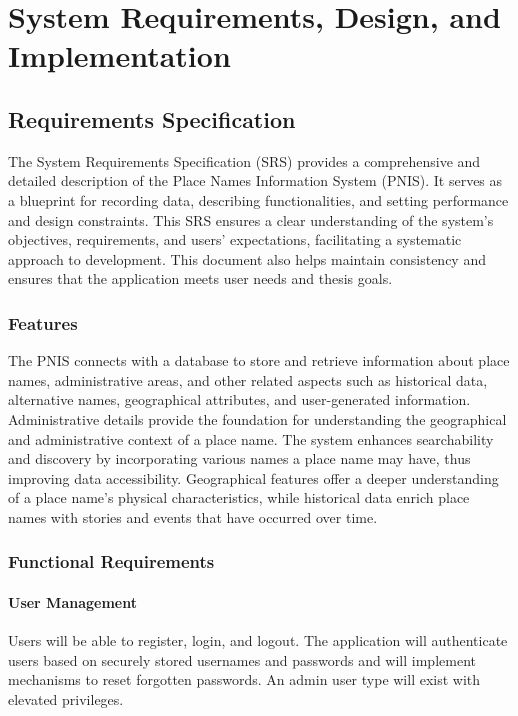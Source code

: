 \chapter{System Requirements, Design, and Implementation}



\section{Requirements Specification}
The System Requirements Specification (SRS) provides a comprehensive and detailed description of the Place Names Information System (PNIS). It serves as a blueprint for recording data, describing functionalities, and setting performance and design constraints. This SRS ensures a clear understanding of the system's objectives, requirements, and users' expectations, facilitating a systematic approach to development. This document also helps maintain consistency and ensures that the application meets user needs and thesis goals.

\subsection{Features}
The PNIS connects with a database to store and retrieve information about place names, administrative areas, and other related aspects such as historical data, alternative names, geographical attributes, and user-generated information.
Administrative details provide the foundation for understanding the geographical and administrative context of a place name. The system enhances searchability and discovery by incorporating various names a place name may have, thus improving data accessibility. Geographical features offer a deeper understanding of a place name’s physical characteristics, while historical data enrich place names with stories and events that have occurred over time.

\subsection{Functional Requirements}

\subsubsection{User Management}
Users will be able to register, login, and logout. The application will authenticate users based on securely stored usernames and passwords and will implement mechanisms to reset forgotten passwords. An admin user type will exist with elevated privileges.


